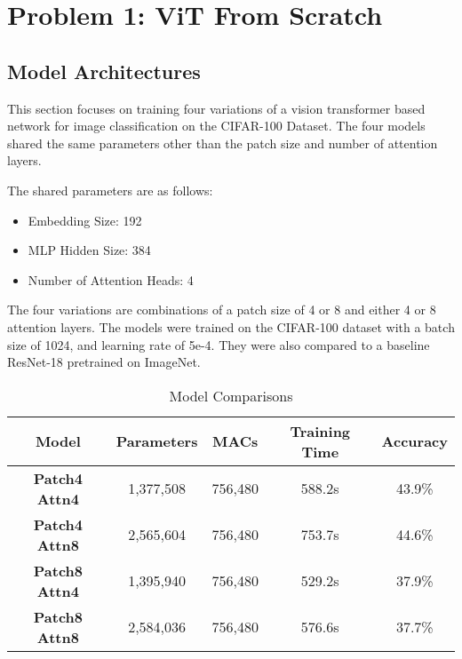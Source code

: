\documentclass{article}
\begin{document}

\raggedright

\section{Problem 1: ViT From Scratch}
\subsection{Model Architectures}
This section focuses on training four
variations of a vision transformer based
network for image classification on the
CIFAR-100 Dataset. The four models shared the
same parameters other than the patch size and
number of attention layers.

The shared parameters are as follows:
\begin{itemize}
    \item Embedding Size: 192
    \item MLP Hidden Size: 384
    \item Number of Attention Heads: 4
\end{itemize}
The four variations are combinations of a
patch size of 4 or 8 and either 4 or 8
attention layers. The models were trained on
the CIFAR-100 dataset with a batch size of
1024, and learning rate of 5e-4. They were
also compared to a baseline ResNet-18
pretrained on ImageNet. 

\begin{table}[h]
    \centering %
    \begin{tabular}{|c|c|c|c|c|}
        \hline
        \textbf{Model} & \textbf{Parameters} & \textbf{MACs} & \textbf{Training Time} & \textbf{Accuracy}  \\
        \hline
        \textbf{Patch4 Attn4} & 1,377,508 & 756,480 & 588.2s & 43.9\% \\
        \hline
        \textbf{Patch4 Attn8} & 2,565,604 & 756,480 & 753.7s & 44.6\% \\
        \hline
        \textbf{Patch8 Attn4} & 1,395,940 & 756,480 & 529.2s & 37.9\% \\
        \hline
        \textbf{Patch8 Attn8} & 2,584,036 & 756,480 & 576.6s & 37.7\% \\
        \hline
    \end{tabular}
    \caption{Model Comparisons}
    \label{tab:complexities}
\end{table}
\end{document}

